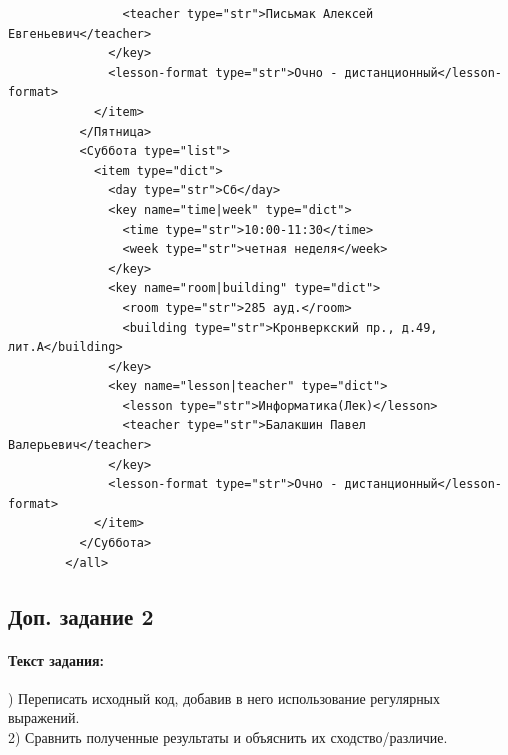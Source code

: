 \documentclass[12pt,onecolumn]{article}
\begin{document}
\begin{flushleft}
\begin{verbatim}
                <teacher type="str">Письмак Алексей Евгеньевич</teacher>
              </key>
              <lesson-format type="str">Очно - дистанционный</lesson-format>
            </item>
          </Пятница>
          <Суббота type="list">
            <item type="dict">
              <day type="str">Сб</day>
              <key name="time|week" type="dict">
                <time type="str">10:00-11:30</time>
                <week type="str">четная неделя</week>
              </key>
              <key name="room|building" type="dict">
                <room type="str">285 ауд.</room>
                <building type="str">Кронверкский пр., д.49, лит.А</building>
              </key>
              <key name="lesson|teacher" type="dict">
                <lesson type="str">Информатика(Лек)</lesson>
                <teacher type="str">Балакшин Павел Валерьевич</teacher>
              </key>
              <lesson-format type="str">Очно - дистанционный</lesson-format>
            </item>
          </Суббота>
        </all>
    \end{verbatim}  
\endgroup
\subsection{Доп. задание 2}
\paragraph{Текст задания:}
\hfill {}) Переписать исходный код, добавив в него использование регулярных выражений.\\
2) Сравнить полученные результаты и объяснить их сходство/различие.\\

\end{flushleft}
\end{document}
